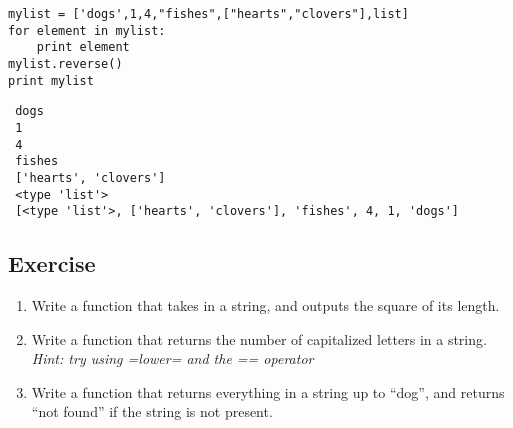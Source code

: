 \documentclass[11pt]{article}
\begin{document}
\begin{verbatim}
mylist = ['dogs',1,4,"fishes",["hearts","clovers"],list]  
for element in mylist:
    print element    
mylist.reverse()
print mylist
\end{verbatim}

\begin{verbatim}
 dogs
 1
 4
 fishes
 ['hearts', 'clovers']
 <type 'list'>
 [<type 'list'>, ['hearts', 'clovers'], 'fishes', 4, 1, 'dogs']
\end{verbatim}
\subsection{Exercise}
\label{sec-2-6}

\begin{enumerate}
\item Write a function that takes in a string, and outputs the square of
   its length.
\item Write a function that returns the number of capitalized letters in
   a string. \emph{Hint: try using =lower= and the == operator}
\item Write a function that returns everything in a string up to ``dog'',
   and returns ``not found'' if the string is not present.
\end{enumerate}
\end{document}
